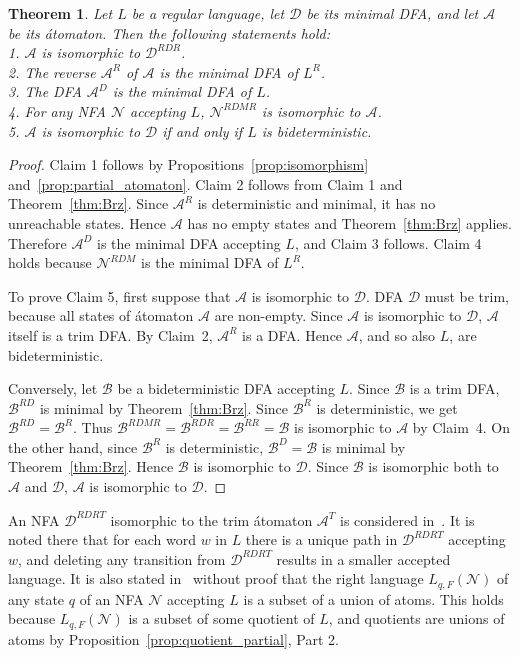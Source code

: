 \documentclass[preprint,12pt]{elsarticle}
\newcommand{\cA}{{\mathcal A}}
\newcommand{\cB}{{\mathcal B}}
\newcommand{\cD}{{\mathcal D}}
\newcommand{\cN}{{\mathcal N}}
\newcommand{\rev}{R}
\newcommand{\deter}{D}
\newcommand{\mini}{M}
\newcommand{\trim}{T}
\newtheorem{theorem}{Theorem}
\begin{document}
\begin{theorem}
\label{thm:atomaton}
Let $L$ be a regular language, let $\cD$ be its minimal DFA, 
and let $\cA$ be its \'atomaton. Then the following statements hold:\\
1. $\cA$ is isomorphic to $\cD^{\rev\deter\rev}$.\\
2. The reverse $\cA^\rev$ of $\cA$ is the minimal DFA of $L^R$.\\
3. The DFA $\cA^\deter$ is the minimal DFA of $L$.\\
4. For any NFA $\cN$ accepting $L$, $\cN^{\rev\deter\mini\rev}$ is isomorphic to  $\cA$.\\
5. $\cA$ is isomorphic to $\cD$ if and only if $L$ is bideterministic.\\
\end{theorem}
\begin{proof}
Claim 1 follows by Propositions~\ref{prop:isomorphism} and~\ref{prop:partial_atomaton}.
Claim 2 follows from Claim 1 and  Theorem~\ref{thm:Brz}.
Since $\cA^R$ is deterministic and minimal, it has no unreachable states. 
Hence $\cA$ has no empty states and Theorem~\ref{thm:Brz} applies. 
Therefore $\cA^D$ is the minimal DFA accepting $L$, and Claim 3 follows. 
Claim 4 holds because $\cN^{RDM}$ is the minimal DFA of $L^R$.

To prove Claim 5, first suppose that $\cA$ is isomorphic to $\cD$.
DFA $\cD$ must be trim, because all states of \'atomaton $\cA$ are non-empty.  
Since  $\cA$ is isomorphic to $\cD$, $\cA$ itself is a trim DFA. 
By Claim~2, $\cA^\rev$ is a DFA. 
Hence $\cA$, and so also $L$, are bideterministic.

Conversely, let $\cB$ be a bideterministic DFA accepting $L$. 
Since $\cB$ is a trim DFA,  $\cB^{\rev\deter}$ is minimal by Theorem~\ref{thm:Brz}.
Since $\cB^\rev$ is deterministic, we get $\cB^{\rev\deter}=\cB^{\rev}$.
Thus $\cB^{\rev\deter\mini\rev}=\cB^{\rev\deter\rev}=\cB^{\rev\rev}=\cB$
is isomorphic to $\cA$ by Claim~4.
On the other hand, 
since $\cB^{\rev}$ is deterministic, $\cB^{\deter}=\cB$ is minimal 
by Theorem~\ref{thm:Brz}. Hence $\cB$ is isomorphic to $\cD$.
Since $\cB$ is isomorphic both to $\cA$ and $\cD$, 
$\cA$ is isomorphic to $\cD$.
\end{proof}

An NFA $\cD^{\rev\deter\rev\trim}$ isomorphic to the trim \'atomaton $\cA^{\trim}$
is considered in~\cite{MaPo95}. It is noted there that for each word $w$ in $L$ 
there is a unique path in $\cD^{\rev\deter\rev\trim}$ accepting $w$, 
and deleting any transition from $\cD^{\rev\deter\rev\trim}$ results 
in a smaller accepted language. 
It is also stated in~\cite{MaPo95} without proof that the
right language $L_{q,F}(\cN)$ of any state $q$ of an NFA $\cN$ accepting $L$ is 
a subset of a union of atoms. This holds because $L_{q,F}(\cN)$ is a subset 
of some quotient of $L$, and quotients are unions of atoms by 
Proposition~\ref{prop:quotient_partial}, Part 2.
\end{document}
